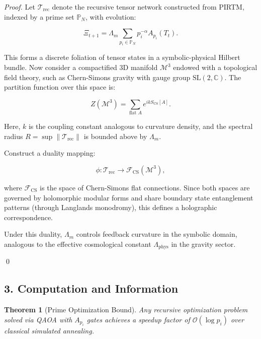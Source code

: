 \documentclass{article}
\theoremstyle{plain}
\newtheorem{theorem}{Theorem}
\begin{document}
\begin{proof}
Let \( \mathcal{T}_{\text{rec}} \) denote the recursive tensor network constructed from PIRTM, indexed by a prime set \( \mathbb{P}_N \), with evolution:

\[
\Xi_{t+1} = \Lambda_m \sum_{p_i \in \mathbb{P}_N} p_i^{-\alpha} A_{p_i}(T_t).
\]

This forms a discrete foliation of tensor states in a symbolic-physical Hilbert bundle. Now consider a compactified 3D manifold \( \mathcal{M}^3 \) endowed with a topological field theory, such as Chern-Simons gravity with gauge group \( \text{SL}(2,\mathbb{C}) \). The partition function over this space is:

\[
Z(\mathcal{M}^3) = \sum_{\text{flat } A} e^{i k S_{\text{CS}}[A]}.
\]

Here, \( k \) is the coupling constant analogous to curvature density, and the spectral radius \( R = \sup \| \mathcal{T}_{\text{rec}} \| \) is bounded above by \( \Lambda_m \).

Construct a duality mapping:

\[
\phi: \mathcal{T}_{\text{rec}} \longrightarrow \mathcal{F}_{\text{CS}}(\mathcal{M}^3),
\]

where \( \mathcal{F}_{\text{CS}} \) is the space of Chern-Simons flat connections. Since both spaces are governed by holomorphic modular forms and share boundary state entanglement patterns (through Langlands monodromy), this defines a holographic correspondence.

Under this duality, \( \Lambda_m \) controls feedback curvature in the symbolic domain, analogous to the effective cosmological constant \( \Lambda_{\text{phys}} \) in the gravity sector.

\qed
\end{proof}


\subsection{3. Computation and Information}

\begin{theorem}[Prime Optimization Bound]
Any recursive optimization problem solved via QAOA with \( A_{p_i} \) gates achieves a speedup factor of \( \mathcal{O}(\log p_i) \) over classical simulated annealing.
\end{theorem}
\end{document}
